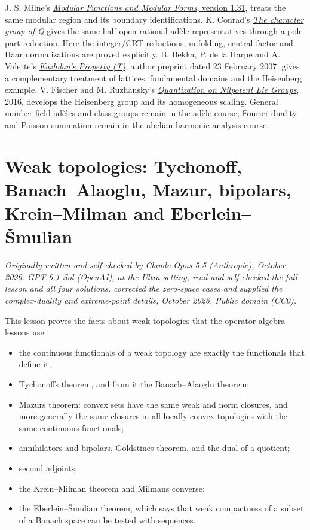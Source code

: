 \documentclass[
  english,
  11pt,
  a4paper,
]{article}
\providecommand{\tightlist}{%
  \setlength{\itemsep}{0pt}\setlength{\parskip}{0pt}}
\begin{document}
J. S. Milne's
\href{https://www.jmilne.org/math/CourseNotes/MF.pdf}{\emph{Modular
Functions and Modular Forms}, version 1.31}, treats the same modular
region and its boundary identifications. K. Conrad's
\href{https://kconrad.math.uconn.edu/blurbs/gradnumthy/characterQ.pdf}{\emph{The
character group of Q}} gives the same half-open rational adèle
representatives through a pole-part reduction. Here the integer/CRT
reductions, unfolding, central factor and Haar normalizations are proved
explicitly. B. Bekka, P. de la Harpe and A. Valette's
\href{https://perso.univ-rennes1.fr/bachir.bekka/KazhdanTotal.pdf}{\emph{Kazhdan's
Property (T)}}, author preprint dated 23 February 2007, gives a
complementary treatment of lattices, fundamental domains and the
Heisenberg example. V. Fischer and M. Ruzhansky's
\href{https://biblio.ugent.be/publication/8585474}{\emph{Quantization on
Nilpotent Lie Groups}}, 2016, develops the Heisenberg group and its
homogeneous scaling. General number-field adèles and class groups remain
in the adèle course; Fourier duality and Poisson summation remain in the
abelian harmonic-analysis course.

\section{Weak topologies: Tychonoff, Banach--Alaoglu, Mazur, bipolars,
Krein--Milman and
Eberlein--Šmulian}\label{weak-topologies-tychonoff-banach-alaoglu-mazur-bipolars-krein-milman-and-eberlein-smulian}

\emph{Originally written and self-checked by Claude Opus 5.5
(Anthropic), October 2026. GPT-6.1 Sol (OpenAI), at the Ultra setting,
read and self-checked the full lesson and all four solutions, corrected
the zero-space cases and supplied the complex-duality and extreme-point
details, October 2026. Public domain (CC0).}

This lesson proves the facts about weak topologies that the
operator-algebra lessons use:

\begin{itemize}
\tightlist
\item
  the continuous functionals of a weak topology are exactly the
  functionals that define it;
\item
  Tychonoff\textquotesingle s theorem, and from it the Banach--Alaoglu
  theorem;
\item
  Mazur\textquotesingle s theorem: convex sets have the same weak and
  norm closures, and more generally the same closures in all locally
  convex topologies with the same continuous functionals;
\item
  annihilators and bipolars, Goldstine\textquotesingle s theorem, and
  the dual of a quotient;
\item
  second adjoints;
\item
  the Krein--Milman theorem and Milman\textquotesingle s converse;
\item
  the Eberlein--Šmulian theorem, which says that weak compactness of a
  subset of a Banach space can be tested with sequences.
\end{itemize}
\end{document}
